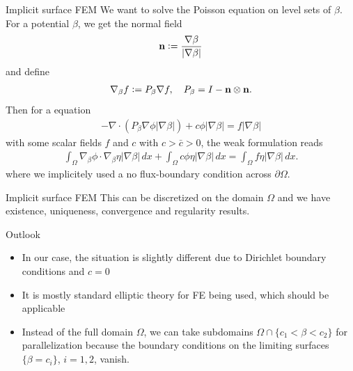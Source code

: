 \documentclass[
	english,%
	logo=false,%
	eurofusion=false, %
	titlegraphic=true, %
	]{ippbeamer}
\begin{document}
\begin{frame}{Implicit surface FEM}
	We want to solve the Poisson equation on level sets of $\beta$.
	For a potential $\beta$, we get the normal field
	\begin{align*}
		\mathbf{n} \vcentcolon= \frac{\nabla \beta}{|\nabla \beta|}
	\end{align*}
	and define 
	\vspace*{-0.25cm}
	\begin{align*}
		\nabla_\beta f \vcentcolon= P_\beta \nabla f, \quad P_\beta = I - \mathbf{n} \otimes \mathbf{n}.
	\end{align*}
	Then for a equation 
	\vspace*{-0.25cm}
	\begin{align*}
		- \nabla \cdot (P_\beta \nabla \phi |\nabla \beta |) + c \phi |\nabla \beta | = 
			f |\nabla \beta |
	\end{align*}
	with some scalar fields $f$ and $c$ with $c > \bar{c} > 0$, the weak formulation
	reads
	\begin{align*}
		\int_\Omega \nabla_\beta \phi \cdot \nabla_\beta \eta |\nabla \beta | \, dx 
			+ \int_\Omega c \phi \eta |\nabla \beta | \, dx 
			= \int_\Omega f \eta |\nabla \beta | \, dx.
	\end{align*}
	where we implicitely used a no flux-boundary condition across 
	$\partial \Omega$. 
\end{frame}

\begin{frame}{Implicit surface FEM}
	This can be discretized on the domain $\Omega$ and we have existence,
	uniqueness, convergence and regularity results.

	\begin{exampleblock}{Outlook}
		\begin{itemize}
			\item In our case, the situation is slightly different due to Dirichlet boundary conditions
			and $c = 0$
			\item It is mostly standard elliptic theory for FE being used, 
					which should be applicable
			\item Instead of the full domain $\Omega$,
					we can take subdomains $\Omega \cap \{ c_1 < \beta < c_2 \}$ for 
					parallelization because the boundary conditions on the limiting surfaces
					$\{ \beta = c_i \}$, $i=1,2$, vanish.
		\end{itemize}
	\end{exampleblock}
\end{frame}
\end{document}
